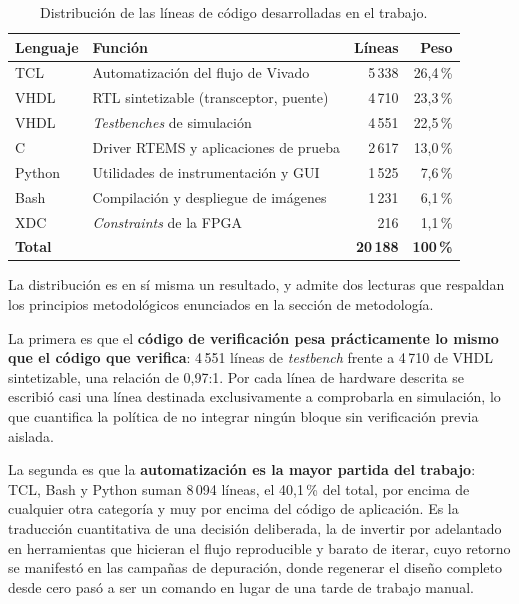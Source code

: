 \begin{table}[H]
    \centering
    \begin{tabular}{llrr}
        \hline
        \textbf{Lenguaje} & \textbf{Función} & \textbf{Líneas} & \textbf{Peso} \\
        \hline
        TCL   & Automatización del flujo de Vivado          & 5\,338  & 26,4\,\% \\
        VHDL  & RTL sintetizable (transceptor, puente)      & 4\,710  & 23,3\,\% \\
        VHDL  & \textit{Testbenches} de simulación          & 4\,551  & 22,5\,\% \\
        C     & Driver RTEMS y aplicaciones de prueba       & 2\,617  & 13,0\,\% \\
        Python& Utilidades de instrumentación y GUI         & 1\,525  & 7,6\,\% \\
        Bash  & Compilación y despliegue de imágenes        & 1\,231  & 6,1\,\% \\
        XDC   & \textit{Constraints} de la FPGA             & 216    & 1,1\,\% \\
        \hline
        \multicolumn{2}{l}{\textbf{Total}} & \textbf{20\,188} & \textbf{100\,\%} \\
        \hline
    \end{tabular}
    \caption{Distribución de las líneas de código desarrolladas en el trabajo.}
    \label{tab:loc}
\end{table}

La distribución es en sí misma un resultado, y admite dos lecturas que respaldan los principios
metodológicos enunciados en la sección de metodología.

La primera es que el \textbf{código de verificación pesa prácticamente lo mismo que el código que
verifica}: 4\,551 líneas de \textit{testbench} frente a 4\,710 de VHDL sintetizable, una relación de
0,97:1. Por cada línea de hardware descrita se escribió casi una línea destinada exclusivamente a
comprobarla en simulación, lo que cuantifica la política de no integrar ningún bloque sin
verificación previa aislada.

La segunda es que la \textbf{automatización es la mayor partida del trabajo}: TCL, Bash y Python
suman 8\,094 líneas, el 40,1\,\% del total, por encima de cualquier otra categoría y muy por encima
del código de aplicación. Es la traducción cuantitativa de una decisión deliberada, la de invertir por
adelantado en herramientas que hicieran el flujo reproducible y barato de iterar, cuyo retorno se
manifestó en las campañas de depuración, donde regenerar el diseño completo desde cero pasó a ser
un comando en lugar de una tarde de trabajo manual.

